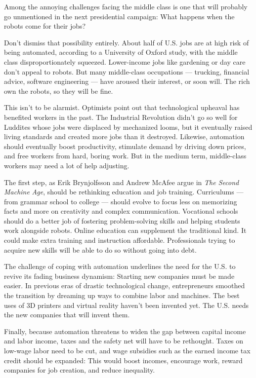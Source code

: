 \documentclass[UTF8,11pt]{ctexart}
\begin{document}
Among the annoying challenges facing the middle class is one that will probably go unmentioned in the next presidential campaign: What happens when the robots come for their jobs?


Don’t dismiss that possibility entirely. About half of U.S. jobs are at high risk of being automated, according to a University of Oxford study, with the middle class disproportionately squeezed. Lower-income jobs like gardening or day care don’t appeal to robots. But many middle-class occupations — trucking, financial advice, software engineering — have aroused their interest, or soon will. The rich own the robots, so they will be fine.


This isn’t to be alarmist. Optimists point out that technological upheaval has benefited workers in the past. The Industrial Revolution didn’t go so well for Luddites whose jobs were displaced by mechanized looms, but it eventually raised living standards and created more jobs than it destroyed. Likewise, automation should eventually boost productivity, stimulate demand by driving down prices, and free workers from hard, boring work. But in the medium term, middle-class workers may need a lot of help adjusting.


The first step, as Erik Brynjolfsson and Andrew McAfee argue in \textit{The Second Machine} \textit{Age}, should be rethinking education and job training. Curriculums — from grammar school to college — should evolve to focus less on memorizing facts and more on creativity and complex communication. Vocational schools should do a better job of fostering problem-solving skills and helping students work alongside robots. Online education can supplement the traditional kind. It could make extra training and instruction affordable. Professionals trying to acquire new skills will be able to do so without going into debt.


The challenge of coping with automation underlines the need for the U.S. to revive its fading business dynamism: Starting new companies must be made easier. In previous eras of drastic technological change, entrepreneurs smoothed the transition by dreaming up ways to combine labor and machines. The best uses of 3D printers and virtual reality haven’t been invented yet. The U.S. needs the new companies that will invent them.


Finally, because automation threatens to widen the gap between capital income and labor income, taxes and the safety net will have to be rethought. Taxes on low-wage labor need to be cut, and wage subsidies such as the earned income tax credit should be expanded: This would boost incomes, encourage work, reward companies for job creation, and reduce inequality.
\end{document}
